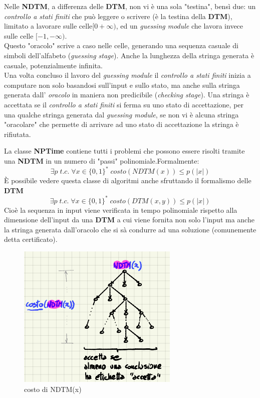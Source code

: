 \documentclass[a4paper]{article}
\begin{document}
Nelle \textbf{NDTM}, a differenza delle \textbf{DTM}, non vi è una sola "testina", bensì due: un \textit{controllo a stati finiti} che può leggere o scrivere (è la testina della \textbf{DTM}), limitato a lavorare sulle celle$[0 + \infty)$, ed un \textit{guessing module} che lavora invece sulle celle $[-1,- \infty)$.\\
Questo "oracolo" scrive a caso nelle celle, generando una sequenza casuale di simboli dell'alfabeto (\textit{guessing stage}).
Anche la lunghezza della stringa generata è casuale, potenzialmente infinita.\\
Una volta concluso il lavoro del \textit{guessing module} il \textit{controllo a stati finiti} inizia a computare non solo basandosi sull'input e sullo stato, ma anche sulla stringa generata dall' \textit{oracolo} in maniera non predicibile (\textit{checking stage}).
Una stringa è accettata se il \textit{controllo a stati finiti} si ferma su uno stato di accettazione, per una qualche stringa generata dal \textit{guessing module}, se non vi è alcuna stringa "oracolare" che permette di arrivare ad uno stato di accettazione la stringa è rifiutata.


La classe \textbf{NPTime} contiene tutti i problemi che possono essere risolti tramite una \textbf{NDTM} in un numero di "passi" polinomiale.Formalmente: $$\exists p \; t.c. \; \forall x \in \{0,1\}^* \; costo(NDTM(x)) \leq p(\lvert x \rvert)$$
È possibile vedere questa classe di algoritmi anche sfruttando il formalismo delle \textbf{DTM}
$$\exists p \; t.c. \; \forall x \in \{0,1\}^* \; costo(DTM(x,y)) \leq p(\lvert x \rvert)$$
	Cioè la sequenza in input viene verificata in tempo polinomiale rispetto alla dimensione dell'input da una \textbf{DTM} a cui viene fornita non solo l'input ma anche la stringa generata dall'oracolo che si sà condurre ad una soluzione (comunemente detta certificato).
\begin{figure}[!ht]
\centering
\includegraphics[scale = 0.6]{./img/E1_NDTM.png}
\caption{costo di NDTM(x)} \label{FIG:E1_NDTM}
\end{figure} 
\end{document}

